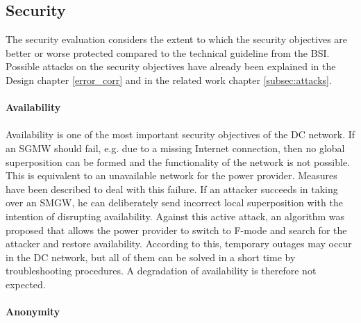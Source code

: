 \subsection{Security}
The security evaluation considers the extent to which the security objectives are better or worse protected compared to the technical guideline from the BSI. Possible attacks on the security objectives have already been explained in the Design chapter \ref{error_corr} and in the related work chapter \ref{subsec:attacks}.
\\
\\
\textbf{Availability}
\\
\\
Availability is one of the most important security objectives of the DC network. If an SGMW should fail, e.g. due to a missing Internet connection, then no global superposition can be formed and the functionality of the network is not possible. This is equivalent to an unavailable network for the power provider. Measures have been described to deal with this failure. If an attacker succeeds in taking over an SMGW, he can deliberately send incorrect local superposition with the intention of disrupting availability. Against this active attack, an algorithm was proposed that allows the power provider to switch to F-mode and search for the attacker and restore availability. According to this, temporary outages may occur in the DC network, but all of them can be solved in a short time by troubleshooting procedures. A degradation of availability is therefore not expected.
\\
\\
\textbf{Anonymity}
\\
\\
